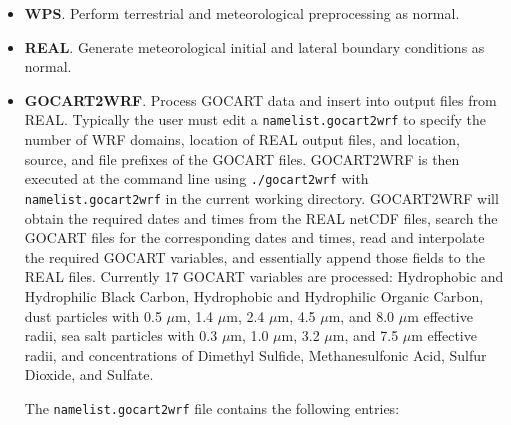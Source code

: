 \begin{itemize}
\item \textbf{WPS}. Perform terrestrial and meteorological preprocessing as 
normal.
\item \textbf{REAL}. Generate meteorological initial and lateral boundary
conditions as normal.
\item \textbf{GOCART2WRF}. Process GOCART data and insert into output
files from REAL. Typically the user must edit a \texttt{namelist.gocart2wrf} 
to specify the number of WRF domains, location of REAL output files, and 
location, source, and file prefixes of the GOCART files. GOCART2WRF is then 
executed at the command line using \texttt{./gocart2wrf} with 
\texttt{namelist.gocart2wrf} in the current working directory. GOCART2WRF will
obtain the required dates and times from the REAL netCDF files, search the 
GOCART files for the corresponding dates and times, read and interpolate
the required GOCART variables, and essentially append those fields to the
REAL files. Currently 17 GOCART variables are processed: Hydrophobic and 
Hydrophilic Black Carbon, Hydrophobic and Hydrophilic Organic Carbon, dust 
particles with 0.5 $\mu$m, 1.4 $\mu$m, 2.4 $\mu$m, 4.5 $\mu$m, and 8.0 $\mu$m 
effective radii, sea salt particles with 0.3 $\mu$m, 1.0 $\mu$m, 3.2 $\mu$m, 
and 7.5 $\mu$m effective radii, and concentrations of Dimethyl Sulfide, 
Methanesulfonic Acid, Sulfur Dioxide, and Sulfate.

The \texttt{namelist.gocart2wrf} file contains the following entries:


\end{itemize}
